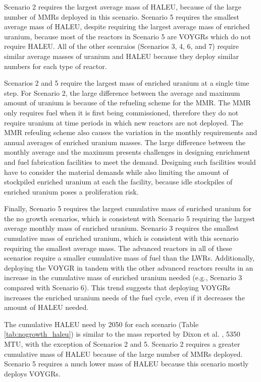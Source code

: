 Scenario 2 requires the largest average mass of \gls{HALEU}, because 
of the large number of \glspl{MMR} deployed in this scenario. Scenario 
5 requires the smallest average mass of \gls{HALEU}, despite requiring the 
largest average mass of enriched uranium, because most of the 
reactors in Scenario 5 are VOYGRs which do not require \gls{HALEU}. 
All of the other scenraios (Scenarios 3, 4, 6, and 7) require similar 
average masses of uranium and \gls{HALEU} because they deploy similar 
numbers for each type of reactor. 

Scenarios 2 and 5 require the largest mass of enriched uranium at a single 
time step. For Scenario 2, the large difference between the average and 
maximum amount of uranium is because of the refueling scheme for the 
\gls{MMR}. The \gls{MMR} only requires fuel when it is first being 
commissioned, therefore they do not require uranium at time periods in 
which
new reactors are not deployed. The \gls{MMR} refeuling scheme also 
causes the variation in the monthly requirements and annual averages of 
enriched uranium masses. The large difference between the 
monthly average and the maximum presents challenges in designing enrichment 
and fuel fabrication facilities 
to meet the demand. Designing such facilities would have to consider the 
material demands while also limiting the amount of stockpiled enriched 
uranium at each the facility, because idle stockpiles of enriched uranium 
poses a proliferation risk. 

Finally, Scenario 5 requires the largest cumulative mass of enriched uranium 
for the no growth scenarios, which is consistent with Scenario 5 requiring 
the largest average monthly mass of enriched uranium.  Scenario 3 requires 
the smallest cumulative 
mass of enriched uranium, which is consistent with this scenario requiring 
the smallest average mass. The advanced reactors 
in all of these scenarios require a smaller cumulative mass of fuel than 
the \glspl{LWR}. Additionally, deploying the VOYGR in tandem with the other 
advanced reactors results in an increase in the cumulative mass 
of enriched uranium needed (e.g., Scenario 3 compared with Scenario 6). This
trend suggests that deploying VOYGRs increases the enriched uranium needs 
of the fuel cycle, even if it decreases the amount of \gls{HALEU} needed. 

The cumulative \gls{HALEU} need by 2050 for each scenario (Table 
\ref{tab:nogrowth_haleu}) is similar to the mass reported by 
Dixon et al. \cite{dixon_estimated_2022}, 5350 MTU, with the exception 
of Scenarios 2 and 5. Scenario 2 requires a greater cumulative mass of 
\gls{HALEU} because of the large number of \glspl{MMR} deployed. Scenario 
5 requires a much lower mass of \gls{HALEU} because this scenario mostly 
deploys VOYGRs. 

